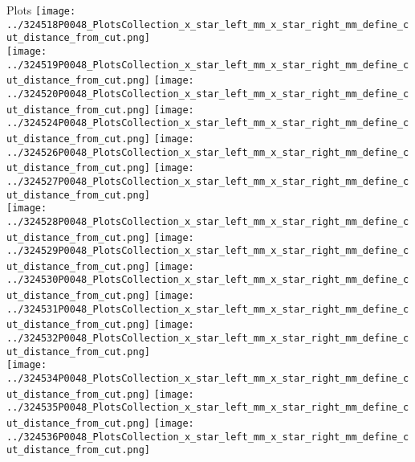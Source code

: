 \documentclass{beamer}
\begin{document}
\begin{frame}
\begin{block}{Plots}
                \texttt{[image: ../324518P0048\_PlotsCollection\_x\_star\_left\_mm\_x\_star\_right\_mm\_define\_cut\_distance\_from\_cut.png]}\\
                \texttt{[image: ../324519P0048\_PlotsCollection\_x\_star\_left\_mm\_x\_star\_right\_mm\_define\_cut\_distance\_from\_cut.png]}
                \texttt{[image: ../324520P0048\_PlotsCollection\_x\_star\_left\_mm\_x\_star\_right\_mm\_define\_cut\_distance\_from\_cut.png]}
                \texttt{[image: ../324524P0048\_PlotsCollection\_x\_star\_left\_mm\_x\_star\_right\_mm\_define\_cut\_distance\_from\_cut.png]}
                \texttt{[image: ../324526P0048\_PlotsCollection\_x\_star\_left\_mm\_x\_star\_right\_mm\_define\_cut\_distance\_from\_cut.png]}
                \texttt{[image: ../324527P0048\_PlotsCollection\_x\_star\_left\_mm\_x\_star\_right\_mm\_define\_cut\_distance\_from\_cut.png]}\\
                \texttt{[image: ../324528P0048\_PlotsCollection\_x\_star\_left\_mm\_x\_star\_right\_mm\_define\_cut\_distance\_from\_cut.png]}
                \texttt{[image: ../324529P0048\_PlotsCollection\_x\_star\_left\_mm\_x\_star\_right\_mm\_define\_cut\_distance\_from\_cut.png]}
                \texttt{[image: ../324530P0048\_PlotsCollection\_x\_star\_left\_mm\_x\_star\_right\_mm\_define\_cut\_distance\_from\_cut.png]}
                \texttt{[image: ../324531P0048\_PlotsCollection\_x\_star\_left\_mm\_x\_star\_right\_mm\_define\_cut\_distance\_from\_cut.png]}
                \texttt{[image: ../324532P0048\_PlotsCollection\_x\_star\_left\_mm\_x\_star\_right\_mm\_define\_cut\_distance\_from\_cut.png]}\\
                \texttt{[image: ../324534P0048\_PlotsCollection\_x\_star\_left\_mm\_x\_star\_right\_mm\_define\_cut\_distance\_from\_cut.png]}
                \texttt{[image: ../324535P0048\_PlotsCollection\_x\_star\_left\_mm\_x\_star\_right\_mm\_define\_cut\_distance\_from\_cut.png]}
                \texttt{[image: ../324536P0048\_PlotsCollection\_x\_star\_left\_mm\_x\_star\_right\_mm\_define\_cut\_distance\_from\_cut.png]}

        \end{block}
\end{frame}
\end{document}
